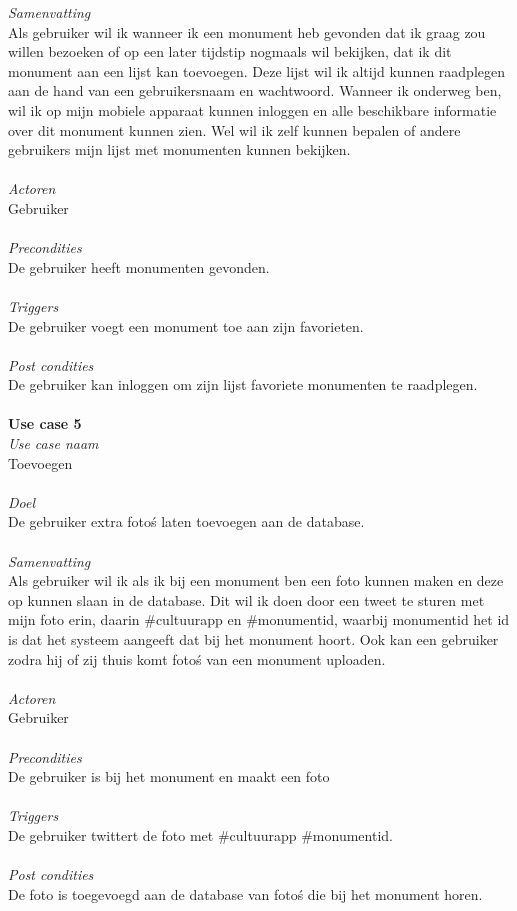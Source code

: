 \documentclass[a4paper,10pt]{article}
\begin{document}
			\textit{Samenvatting}\\
			Als gebruiker wil ik wanneer ik een monument heb gevonden dat ik graag zou willen bezoeken of op een later tijdstip nogmaals wil bekijken, dat ik dit monument aan een lijst kan toevoegen. Deze lijst wil ik altijd kunnen raadplegen aan de hand van een gebruikersnaam en wachtwoord. Wanneer ik onderweg ben, wil ik op mijn mobiele apparaat kunnen inloggen en alle beschikbare informatie over dit monument kunnen zien. Wel wil ik zelf kunnen bepalen of andere gebruikers mijn lijst met monumenten kunnen bekijken.\\ \\
			\textit{Actoren}\\
			Gebruiker\\ \\
			\textit{Precondities}\\
			De gebruiker heeft monumenten gevonden.\\ \\
			\textit{Triggers}\\
			De gebruiker voegt een monument toe aan zijn favorieten.\\ \\
			\textit{Post condities}\\
			De gebruiker kan inloggen om zijn lijst favoriete monumenten te raadplegen.\\
			\\
			\textbf{Use case 5}\\
			\textit{Use case naam}\\
			Toevoegen\\ \\
			\textit{Doel}\\
			De gebruiker extra foto\'s laten toevoegen aan de database.\\ \\
			\textit{Samenvatting}\\
			Als gebruiker wil ik als ik bij een monument ben een foto kunnen maken en deze op kunnen slaan in de database. Dit wil ik doen door een tweet te sturen met mijn foto erin, daarin \#cultuurapp en \#monumentid, waarbij monumentid het id is dat het systeem aangeeft dat bij het monument hoort. Ook kan een gebruiker zodra hij of zij thuis komt foto\'s van een monument uploaden.\\ \\
			\textit{Actoren}\\
			Gebruiker\\ \\
			\textit{Precondities}\\
			De gebruiker is bij het monument en maakt een foto\\ \\
			\textit{Triggers}\\
			De gebruiker twittert de foto met \#cultuurapp \#monumentid.\\ \\
			\textit{Post condities}\\
			De foto is toegevoegd aan de database van foto\'s die bij het monument horen.
\end{document}
